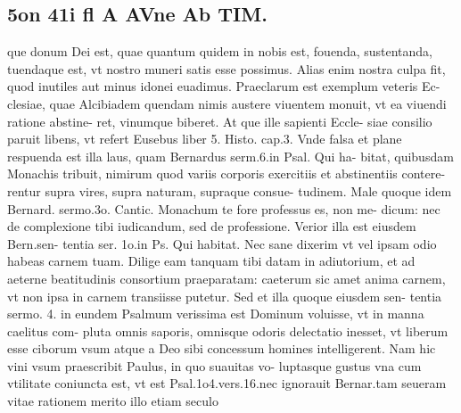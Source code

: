 \documentclass{article}
\begin{document}
\begin{pages}
\section*{5on 41i fl A AVne Ab TIM. }\pstart que donum Dei est, quae quantum quidem in nobis est, fouenda, sustentanda, tuendaque est, vt nostro muneri satis esse possimus. Alias enim nostra culpa fit, quod inutiles aut minus idonei euadimus. Praeclarum est exemplum veteris Ec- clesiae, quae Alcibiadem quendam nimis austere viuentem monuit, vt ea viuendi ratione abstine- ret, vinumque biberet. At que ille sapienti Eccle- siae consilio paruit libens, vt refert Eusebus liber 5. Histo. cap.3. Vnde falsa et plane respuenda est illa laus, quam Bernardus serm.6.in Psal. Qui ha- bitat, quibusdam Monachis tribuit, nimirum quod variis corporis exercitiis et abstinentiis contere- rentur supra vires, supra naturam, supraque consue- tudinem. Male quoque idem Bernard. sermo.3o. Cantic. Monachum te fore professus es, non me- dicum: nec de complexione tibi iudicandum, sed de professione. Verior illa est eiusdem Bern.sen- tentia ser. 1o.in Ps. Qui habitat. Nec sane dixerim vt vel ipsam odio habeas carnem tuam. Dilige eam tanquam tibi datam in adiutorium, et ad aeterne beatitudinis consortium praeparatam: caeterum sic amet anima carnem, vt non ipsa in carnem transiisse putetur. Sed et illa quoque eiusdem sen- tentia sermo. 4. in eundem Psalmum verissima est Dominum voluisse, vt in manna caelitus com- pluta omnis saporis, omnisque odoris delectatio inesset, vt liberum esse ciborum vsum atque a Deo sibi concessum homines intelligerent. Nam hic vini vsum praescribit Paulus, in quo suauitas vo- luptasque gustus vna cum vtilitate coniuncta est, vt est Psal.1o4.vers.16.nec ignorauit Bernar.tam seueram vitae rationem merito illo etiam seculo  \pend

\end{pages}
\end{document}
